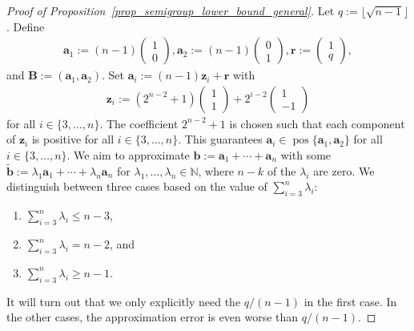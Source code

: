 \documentclass[pdflatex]{sn-jnl}
\DeclareMathOperator{\pos}{pos}
\newcommand{\N}{\mathbb{N}}
\newcommand{\bb}{\bm{b}}
\newcommand{\ba}{\bm{a}}
\newcommand{\bz}{\bm{z}}
\newcommand{\br}{\bm{r}}
\newcommand{\bB}{\bm{B}}
\theoremstyle{thmstyleone}%
\theoremstyle{thmstyletwo}%
\theoremstyle{thmstylethree}%
\begin{document}
	\begin{proof}[Proof of Proposition~\ref{prop_semigroup_lower_bound_general}]
		Let $q := \lfloor \sqrt{n-1}\rfloor$. Define 
		\begin{align*}
			\ba_1 := (n-1)\begin{pmatrix}
				1 \\ 0
			\end{pmatrix}, \ba_2 := (n-1)\begin{pmatrix}
				0 \\ 1
			\end{pmatrix}, \br := \begin{pmatrix}
				1 \\ q
			\end{pmatrix},
		\end{align*}
		and $\bB := (\ba_1,\ba_2)$. 
		Set $\ba_i := (n-1)\bz_i + \br$ with
		\begin{align*}
			\bz_i := (2^{n-2} + 1)\begin{pmatrix}
				1 \\ 1
			\end{pmatrix} +2^{i-2} \begin{pmatrix}
				1 \\ -1
			\end{pmatrix}
		\end{align*}
		for all $i\in\lbrace 3,\ldots,n\rbrace$. 
		The coefficient $2^{n-2} + 1$ is chosen such that each component of $\bz_i$ is positive for all $i\in\lbrace 3,\ldots,n\rbrace$. This guarantees $\ba_i \in\pos\lbrace \ba_1,\ba_2\rbrace$ for all $i\in\lbrace 3,\ldots,n\rbrace$. 
		We aim to approximate $\bb := \ba_1 + \cdots + \ba_n$ with some $\tilde{\bb}:=\lambda_1\ba_1 + \cdots + \lambda_n\ba_n$ for $\lambda_1,\ldots,\lambda_n\in \N$, where $n-k$ of the $\lambda_i$ are zero. 
		We distinguish between three cases based on the value of $\sum_{i=3}^n\lambda_i$: 
		\begin{enumerate}
			\item $\sum_{i=3}^n\lambda_i\leq n-3$,
			\item $\sum_{i=3}^n\lambda_i = n-2$, and 
			\item $\sum_{i=3}^n\lambda_i\geq n-1$.
		\end{enumerate}
		It will turn out that we only explicitly need the $q/(n-1)$ in the first case.
		In the other cases, the approximation error is even worse than $q/(n-1)$. 
		

\end{proof}
\end{document}
